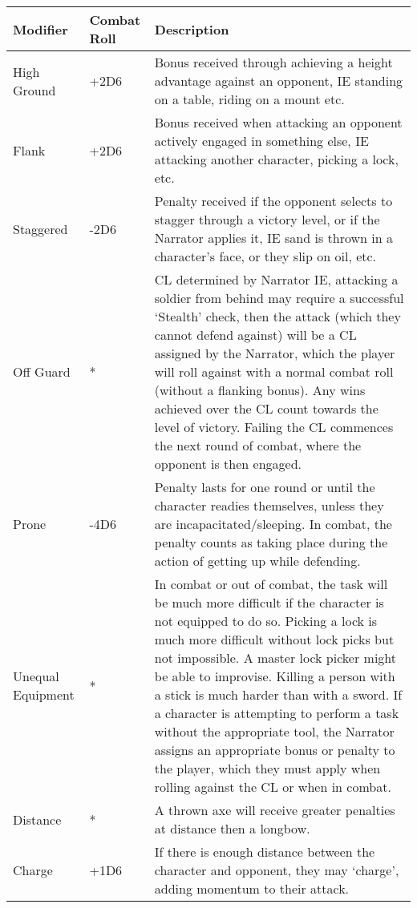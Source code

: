 \begin{center}
    \begin{xltabular}{\textwidth}{|l l X|} 
        \hline 
        \textbf{Modifier} & \textbf{Combat Roll} & \textbf{Description} \\ 
        \hline
        High Ground & +2D6 & 
            Bonus received through achieving a height advantage against an opponent, IE standing on a table, riding on a mount etc. \\
        Flank & +2D6 & 
            Bonus received when attacking an opponent actively engaged in something else, IE attacking another character, picking a lock, etc. \\
        Staggered & -2D6 & 
            Penalty received if the opponent selects to stagger through a victory level, or if the Narrator applies it, IE sand is thrown in a character's face, or they slip on oil, etc. \\
        Off Guard & * & 
            CL determined by Narrator IE, attacking a soldier from behind may require a successful ‘Stealth’ check, then the attack (which they cannot defend against) will be a CL assigned by the Narrator, which the player will roll against with a normal combat roll (without a flanking bonus). Any wins achieved over the CL count towards the level of victory. Failing the CL commences the next round of combat, where the opponent is then engaged. \\
        Prone & -4D6 & 
            Penalty lasts for one round or until the character readies themselves, unless they are incapacitated/sleeping. In combat, the penalty counts as taking place during the action of getting up while defending. \\
        Unequal Equipment & * & 
            In combat or out of combat, the task will be much more difficult if the character is not equipped to do so. Picking a lock is much more difficult without lock picks but not impossible. A master lock picker might be able to improvise. Killing a person with a stick is much harder than with a sword. If a character is attempting to perform a task without the appropriate tool, the Narrator assigns an appropriate bonus or penalty to the player, which they must apply when rolling against the CL or when in combat. \\
        Distance & * & 
            A thrown axe will receive greater penalties at distance then a longbow. \\
        Charge & +1D6 &
            If there is enough distance between the character and opponent, they may ‘charge’, adding momentum to their attack. \\

\end{xltabular}
\end{center}
